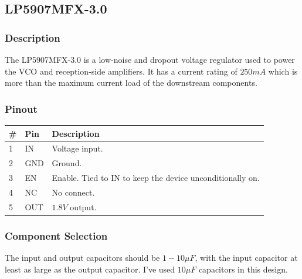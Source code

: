 \subsection{LP5907MFX-3.0}
\label{sec:mic5301-3.3}

\subsubsection{Description}
\label{sec:mic5301-3.3-description}

The LP5907MFX-3.0 is a low-noise and dropout voltage regulator used to power the VCO and
reception-side amplifiers. It has a current rating of $250 \si{mA}$ which is more than the maximum
current load of the downstream components.

\subsubsection{Pinout}
\label{sec:lp5907mfx-3.0-pinout}

\label{tab:lp5907mfx-3.0-pinout}
\begin{tabularx}{\textwidth}{l l X}
        \caption{LP5907MFX-3.0 pinout.}                                      \\
        \toprule
        \# & Pin & Description                                               \\
        \midrule
	1  & IN  & Voltage input.                                            \\
	2  & GND & Ground.                                                   \\
	3  & EN  & Enable. Tied to IN to keep the device unconditionally on. \\
	4  & NC  & No connect.                                               \\
	5  & OUT & $1.8 \si{V}$ output.                                      \\
        \bottomrule
\end{tabularx}

\subsubsection{Component Selection}
\label{sec:lp5907mfx-3.0-component-selection}

The input and output capacitors should be $1 - 10 \si{\mu F}$, with the input capacitor at least as
large as the output capacitor. I've used $10 \si{\mu F}$ capacitors in this design.

